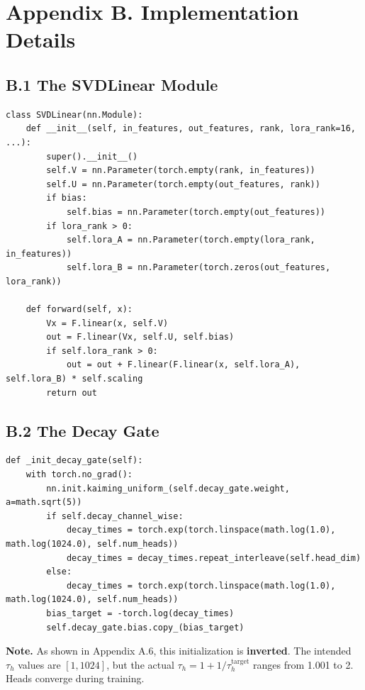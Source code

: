 
\section{Appendix B. Implementation Details}

\subsection{B.1 The SVDLinear Module}

\begin{lstlisting}
class SVDLinear(nn.Module):
    def __init__(self, in_features, out_features, rank, lora_rank=16, ...):
        super().__init__()
        self.V = nn.Parameter(torch.empty(rank, in_features))
        self.U = nn.Parameter(torch.empty(out_features, rank))
        if bias:
            self.bias = nn.Parameter(torch.empty(out_features))
        if lora_rank > 0:
            self.lora_A = nn.Parameter(torch.empty(lora_rank, in_features))
            self.lora_B = nn.Parameter(torch.zeros(out_features, lora_rank))
    
    def forward(self, x):
        Vx = F.linear(x, self.V)
        out = F.linear(Vx, self.U, self.bias)
        if self.lora_rank > 0:
            out = out + F.linear(F.linear(x, self.lora_A), self.lora_B) * self.scaling
        return out
\end{lstlisting}

\subsection{B.2 The Decay Gate}

\begin{lstlisting}
def _init_decay_gate(self):
    with torch.no_grad():
        nn.init.kaiming_uniform_(self.decay_gate.weight, a=math.sqrt(5))
        if self.decay_channel_wise:
            decay_times = torch.exp(torch.linspace(math.log(1.0), math.log(1024.0), self.num_heads))
            decay_times = decay_times.repeat_interleave(self.head_dim)
        else:
            decay_times = torch.exp(torch.linspace(math.log(1.0), math.log(1024.0), self.num_heads))
        bias_target = -torch.log(decay_times)
        self.decay_gate.bias.copy_(bias_target)
\end{lstlisting}

\textbf{Note.} As shown in Appendix A.6, this initialization is \textbf{inverted}. 
The intended $\tau_h$ values are $[1, 1024]$, but the actual $\tau_h = 1 + 1/\tau_h^\text{target}$ 
ranges from 1.001 to 2. Heads converge during training.


